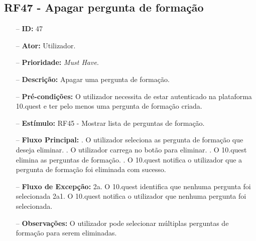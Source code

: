 \subsection{RF47 - Apagar pergunta de formação}
\begin{itemize}
	\item[--] \textbf{ID:} 47
	\item[--]  \textbf{Ator:} Utilizador.
	\item[--]  \textbf{Prioridade:} \textit{Must Have}.
	\item[--]  \textbf{Descrição:} Apagar uma pergunta de formação.
	\item[--]  \textbf{Pré-condições:} O utilizador necessita de estar autenticado na plataforma 10.quest e ter pelo menos uma pergunta de formação criada.
	\item[--]  \textbf{Estímulo:} RF45 - Mostrar lista de perguntas de formação.
	\item[--]  \textbf{Fluxo Principal:} 
	. O utilizador seleciona as pergunta de formação que deseja eliminar.
	. O utilizador carrega no botão para eliminar.
	. O 10.quest elimina as perguntas de formação.
	. O 10.quest notifica o utilizador que a pergunta de formação foi eliminada com sucesso.
	\item[--]  \textbf{Fluxo de Excepção:} 
	\subitem 2a. O 10.quest identifica que nenhuma pergunta foi selecionada
	\subitem 2a1. O 10.quest notifica o utilizador que nenhuma pergunta foi selecionada.
	\item[--]  \textbf{Observações:} O utilizador pode selecionar múltiplas perguntas de formação para serem eliminadas. 
\end{itemize}
\newpage

